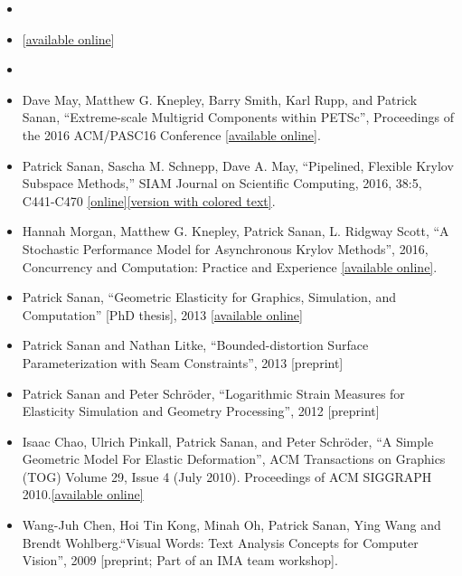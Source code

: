 \begin{itemize}
  \item {}
\item {} [\href{https://arxiv.org/abs/1711.07303}{available online}]
\item {}
\item Dave May, Matthew G. Knepley, Barry Smith, Karl Rupp, and Patrick Sanan, ``Extreme-scale Multigrid Components within PETSc'', Proceedings of the 2016 ACM/PASC16 Conference [\href{http://dl.acm.org/citation.cfm?doid=2929908.2929913}{available online}].
\item Patrick Sanan, Sascha M. Schnepp, Dave A. May, ``Pipelined, Flexible Krylov Subspace Methods,'' SIAM Journal on Scientific Computing, 2016, 38:5, C441-C470 \href{http://dx.doi.org/10.1137/15M1049130}{[online]}\href{http://arxiv.org/abs/1511.07226}{[version with colored text]}.
\item Hannah Morgan, Matthew G. Knepley, Patrick Sanan, L. Ridgway Scott, ``A Stochastic Performance Model for Asynchronous Krylov Methods'', 2016, Concurrency and Computation: Practice and Experience \href{http://onlinelibrary.wiley.com/doi/10.1002/cpe.3820/full}{[available online]}.
\item Patrick Sanan, ``Geometric Elasticity for Graphics, Simulation, and Computation'' [PhD thesis], 2013 \href{http://resolver.caltech.edu/CaltechTHESIS:12052013-121547860}{[available online]}
\item Patrick Sanan and Nathan Litke, ``Bounded-distortion Surface Parameterization with Seam Constraints'', 2013 [preprint]
\item Patrick Sanan and Peter Schr\"{o}der, ``Logarithmic Strain Measures for Elasticity Simulation and Geometry Processing'', 2012 [preprint]
\item Isaac Chao, Ulrich Pinkall, Patrick Sanan, and Peter Schr\"{o}der, ``A Simple Geometric Model For Elastic Deformation'', ACM Transactions on Graphics (TOG) Volume 29, Issue 4 (July 2010). Proceedings of ACM SIGGRAPH 2010.{\href{http://multires.caltech.edu/pubs/GeomElastic.pdf}{[available online]}}
\item Wang-Juh Chen, Hoi Tin Kong, Minah Oh, Patrick Sanan, Ying Wang and Brendt Wohlberg.``Visual Words: Text Analysis Concepts for Computer Vision'', 2009 [preprint; Part of an IMA team workshop].
\end{itemize}
